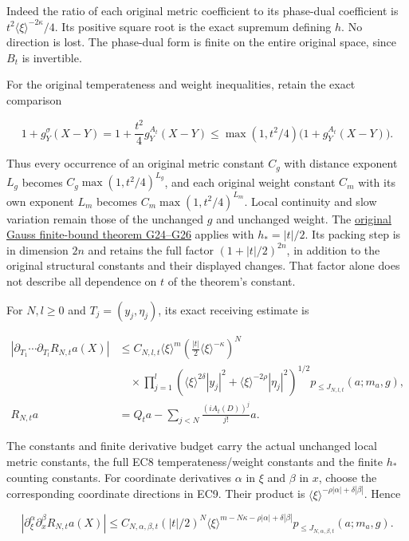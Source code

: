 \documentclass[
  11pt,
]{article}
\begin{document}
Indeed the ratio of each original metric coefficient to its phase-dual
coefficient is \(t^2\langle\xi\rangle^{-2\kappa}/4\). Its positive
square root is the exact supremum defining \(h\). No direction is lost.
The phase-dual form is finite on the entire original space, since
\(B_t\) is invertible.

For the original temperateness and weight inequalities, retain the exact
comparison

\[
 1+g_Y^\sigma(X-Y)
 =1+\frac{t^2}{4}g_Y^{A_t}(X-Y)
 \leq\max(1,t^2/4)\bigl(1+g_Y^{A_t}(X-Y)\bigr).
 \tag{EC8}
\]

Thus every occurrence of an original metric constant \(C_g\) with
distance exponent \(L_g\) becomes \(C_g\max(1,t^2/4)^{L_g}\), and each
original weight constant \(C_m\) with its own exponent \(L_m\) becomes
\(C_m\max(1,t^2/4)^{L_m}\). Local continuity and slow variation remain
those of the unchanged \(g\) and unchanged weight. The
\href{gauss-transform-estimates.pdf\#section*.46}{original Gauss
finite-bound theorem G24--G26} applies with \(h_*=|t|/2\). Its packing
step is in dimension \(2n\) and retains the full factor
\((1+|t|/2)^{2n}\), in addition to the original structural constants and
their displayed changes. That factor alone does not describe all
dependence on \(t\) of the theorem's constant.

For \(N,l\geq0\) and \(T_j=(y_j,\eta_j)\), its exact receiving estimate
is

\[
 \begin{split}
 |\partial_{T_1}\cdots\partial_{T_l}R_{N,t}a(X)|
 &\leq C_{N,l,t}\langle\xi\rangle^m
       \left(\frac{|t|}{2}\langle\xi\rangle^{-\kappa}\right)^N\\
 &\quad{}\times
       \prod_{j=1}^{l}
       \left(\langle\xi\rangle^{2\delta}|y_j|^2+
             \langle\xi\rangle^{-2\rho}|\eta_j|^2\right)^{1/2}
       p_{\leq J_{N,l,t}}(a;m_a,g),\\
 R_{N,t}a&=Q_ta-\sum_{j<N}\frac{(iA_t(D))^j}{j!}a .
 \end{split}
 \tag{EC9}
\]

The constants and finite derivative budget carry the actual unchanged
local metric constants, the full EC8 temperateness/weight constants and
the finite \(h_*\) counting constants. For coordinate derivatives
\(\alpha\) in \(\xi\) and \(\beta\) in \(x\), choose the corresponding
coordinate directions in EC9. Their product is
\(\langle\xi\rangle^{-\rho|\alpha|+\delta|\beta|}\). Hence

\[
 |\partial_\xi^\alpha\partial_x^\beta R_{N,t}a(X)|
 \leq C_{N,\alpha,\beta,t}
       (|t|/2)^N
       \langle\xi\rangle^{m-N\kappa-\rho|\alpha|+\delta|\beta|}
       p_{\leq J_{N,\alpha,\beta,t}}(a;m_a,g).
 \tag{EC10}
\]
\end{document}
